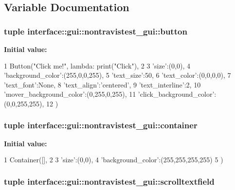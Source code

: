 \subsection{\-Variable \-Documentation}
\hypertarget{namespaceinterface_1_1gui_1_1nontravistest__gui_a525d60392fc3b589db12228b47e40c93}{
\subsubsection[{button}]{\setlength{\rightskip}{0pt plus 5cm}tuple interface\-::gui\-::nontravistest\-\_\-gui\-::button}}\label{namespaceinterface_1_1gui_1_1nontravistest__gui_a525d60392fc3b589db12228b47e40c93}
{\bfseries \-Initial value\-:}
\begin{DoxyCode}
1 Button("Click me!", lambda: print("Click"),
2                 {
3                     'size':(0,0),
4                     'background_color':(255,0,0,255),
5                     'text_size':50,
6                     'text_color':(0,0,0,0),
7                     'text_font':None,
8                     'text_align':'centered',
9                     'text_interline':2,
10                     'mover_background_color':(0,255,0,255),
11                     'click_background_color':(0,0,255,255),
12                 })
\end{DoxyCode}
\hypertarget{namespaceinterface_1_1gui_1_1nontravistest__gui_a5ff5f2d5e57e779661d3c220ee5d41e3}{
\subsubsection[{container}]{\setlength{\rightskip}{0pt plus 5cm}tuple interface\-::gui\-::nontravistest\-\_\-gui\-::container}}\label{namespaceinterface_1_1gui_1_1nontravistest__gui_a5ff5f2d5e57e779661d3c220ee5d41e3}
{\bfseries \-Initial value\-:}
\begin{DoxyCode}
1 Container([],
2                       {
3                         'size':(0,0),
4                         'background_color':(255,255,255,255)
5                       })
\end{DoxyCode}
\hypertarget{namespaceinterface_1_1gui_1_1nontravistest__gui_a4ae34851d4069e77e12f4287c9d03182}{
\subsubsection[{scrolltextfield}]{\setlength{\rightskip}{0pt plus 5cm}tuple interface\-::gui\-::nontravistest\-\_\-gui\-::scrolltextfield}}\label{namespaceinterface_1_1gui_1_1nontravistest__gui_a4ae34851d4069e77e12f4287c9d03182}
